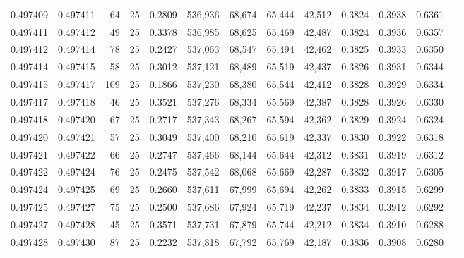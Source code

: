 \begin{tabular}{rrrrrrrrrrrrr}
0.497409 & 0.497411 &    64 &  25 &                                     0.2809 & 536,936 &  68,674 &  65,444 &  42,512 & 0.3824 & 0.3938 & 0.6361 \\
0.497411 & 0.497412 &    49 &  25 &                                     0.3378 & 536,985 &  68,625 &  65,469 &  42,487 & 0.3824 & 0.3936 & 0.6357 \\
0.497412 & 0.497414 &    78 &  25 &                                     0.2427 & 537,063 &  68,547 &  65,494 &  42,462 & 0.3825 & 0.3933 & 0.6350 \\
0.497414 & 0.497415 &    58 &  25 &                                     0.3012 & 537,121 &  68,489 &  65,519 &  42,437 & 0.3826 & 0.3931 & 0.6344 \\
0.497415 & 0.497417 &   109 &  25 &                                     0.1866 & 537,230 &  68,380 &  65,544 &  42,412 & 0.3828 & 0.3929 & 0.6334 \\
0.497417 & 0.497418 &    46 &  25 &                                     0.3521 & 537,276 &  68,334 &  65,569 &  42,387 & 0.3828 & 0.3926 & 0.6330 \\
0.497418 & 0.497420 &    67 &  25 &                                     0.2717 & 537,343 &  68,267 &  65,594 &  42,362 & 0.3829 & 0.3924 & 0.6324 \\
0.497420 & 0.497421 &    57 &  25 &                                     0.3049 & 537,400 &  68,210 &  65,619 &  42,337 & 0.3830 & 0.3922 & 0.6318 \\
0.497421 & 0.497422 &    66 &  25 &                                     0.2747 & 537,466 &  68,144 &  65,644 &  42,312 & 0.3831 & 0.3919 & 0.6312 \\
0.497422 & 0.497424 &    76 &  25 &                                     0.2475 & 537,542 &  68,068 &  65,669 &  42,287 & 0.3832 & 0.3917 & 0.6305 \\
0.497424 & 0.497425 &    69 &  25 &                                     0.2660 & 537,611 &  67,999 &  65,694 &  42,262 & 0.3833 & 0.3915 & 0.6299 \\
0.497425 & 0.497427 &    75 &  25 &                                     0.2500 & 537,686 &  67,924 &  65,719 &  42,237 & 0.3834 & 0.3912 & 0.6292 \\
0.497427 & 0.497428 &    45 &  25 &                                     0.3571 & 537,731 &  67,879 &  65,744 &  42,212 & 0.3834 & 0.3910 & 0.6288 \\
0.497428 & 0.497430 &    87 &  25 &                                     0.2232 & 537,818 &  67,792 &  65,769 &  42,187 & 0.3836 & 0.3908 & 0.6280 \\

\end{tabular}
